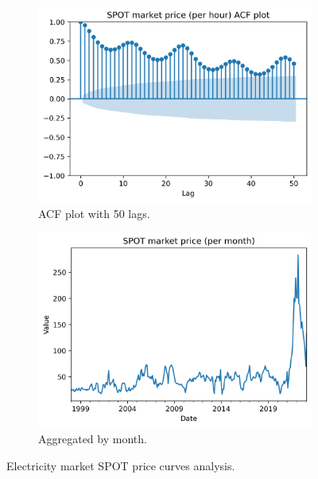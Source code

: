 \begin{figure}[H]\ContinuedFloat
    \begin{subfigure}{.45\textwidth}
        \centering
        \includegraphics[width=1\linewidth]{images/variable_analysis/esios_spot_h_acf}
        \caption{ACF plot with 50 lags.}
    \end{subfigure}
    \begin{subfigure}{.45\textwidth}
        \centering
        \includegraphics[width=1\linewidth]{images/variable_analysis/esios_spot_m_omie_all}
        \caption{Aggregated by month.}
        \label{fig:spot-price-series-month}
    \end{subfigure}

    \caption{Electricity market SPOT price curves analysis.}
    \label{fig:spot-price-series}
\end{figure}

